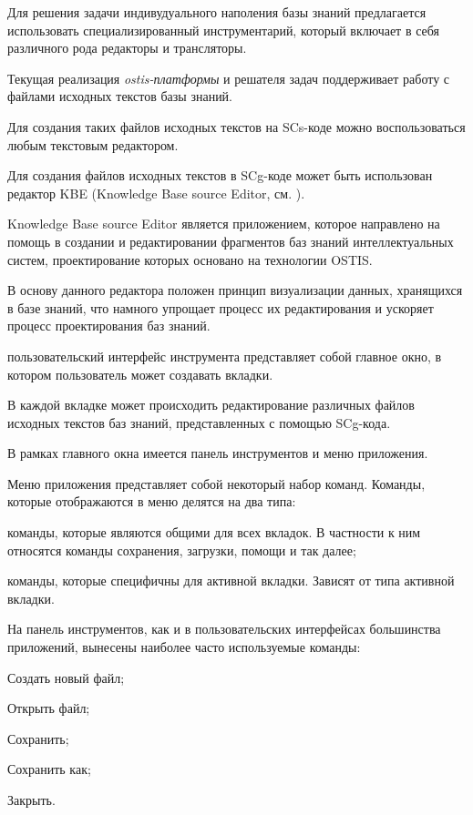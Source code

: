 Для решения задачи индивудуального наполения базы знаний предлагается использовать специализированный инструментарий, который включает в себя различного рода редакторы и трансляторы.

Текущая реализация \textit{ostis-платформы} и решателя задач поддерживает работу с файлами исходных текстов базы знаний.

Для создания таких файлов исходных текстов на SCs-коде можно воспользоваться любым текстовым редактором.

Для создания файлов исходных текстов в SCg-коде может быть использован редактор KBE (Knowledge Base source Editor, см. ). 

Knowledge Base source Editor является приложением, которое направлено на помощь в создании и редактировании фрагментов баз знаний интеллектуальных систем, проектирование которых основано на технологии OSTIS.

В основу данного редактора положен принцип визуализации данных, хранящихся в базе знаний, что намного упрощает процесс их редактирования и ускоряет процесс проектирования баз знаний.

пользовательский интерфейс инструмента представляет собой главное окно, в котором пользователь может создавать вкладки.

В каждой вкладке может происходить редактирование различных файлов исходных текстов баз знаний, представленных с помощью SCg-кода.

В рамках главного окна имеется панель инструментов и меню приложения. 

Меню приложения представляет собой некоторый набор команд. Команды, которые отображаются в меню делятся на два типа:
\begin{textitemize}
\item команды, которые являются общими для всех вкладок. В частности к ним относятся команды сохранения, загрузки, помощи и так далее;
\item команды, которые специфичны для активной вкладки. Зависят от типа активной вкладки.
\end{textitemize}

На панель инструментов, как и в пользовательских интерфейсах большинства приложений, вынесены наиболее часто используемые команды:
\begin{textitemize}
\item Создать новый файл;
\item Открыть файл;
\item Сохранить;
\item Сохранить как;
\item Закрыть.
\end{textitemize}

